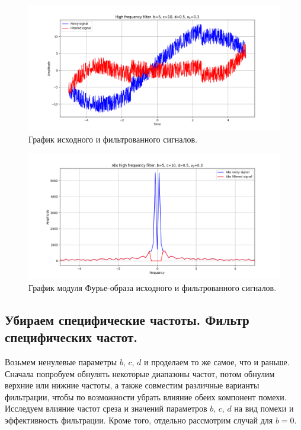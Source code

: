 \documentclass[a4paper, 12pt]{article}
\begin{document}
    \newpage
    \begin{figure}[!htb]
        \centering
        \includegraphics[scale=0.485]{25_u_flt_u_nolow.png}
        \captionsetup{skip=0pt}
        \caption{График исходного и фильтрованного сигналов.}
        \label{fig:fig_g}
    \end{figure}
    \begin{figure}[!htb]
        \centering
        \includegraphics[scale=0.485]{25_abs_u_U_nolow.png}
        \captionsetup{skip=0pt}
        \caption{График модуля Фурье-образа исходного и фильтрованного сигналов.}
        \label{fig:fig_h}
    \end{figure}


    \subsection{Убираем специфические частоты. Фильтр специфических частот.}
    Возьмем ненулевые параметры $b,\,c,\,d$ и проделаем то же самое, что и раньше. Сначала попробуем
    обнулять некоторые диапазоны частот, потом обнулим верхние или нижние частоты, а также
    совместим различные варианты фильтрации, чтобы по возможности убрать влияние обеих компонент помехи.
    Исследуем влияние частот среза и значений параметров $b,\,c,\,d$ на вид помехи и эффективность
    фильтрации. Кроме того, отдельно рассмотрим случай для $b=0$.
\end{document}
